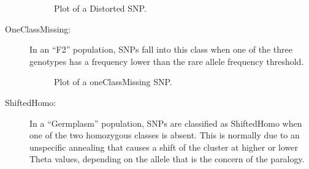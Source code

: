 \documentclass[a4paper,11pt,english]{article}
\begin{document}
\begin{description}
\begin{figure}[H]
\caption{Plot of a Distorted SNP.}\end{figure}

\item [OneClassMissing:] In an ``F2'' population, SNPs fall into this class when one of the three
genotypes has a frequency lower than the rare allele frequency threshold.
\begin{figure}[H]
\centering
\capstart

\caption{Plot of a oneClassMissing SNP.}\end{figure}

\item [ShiftedHomo:] In a ``Germplasm'' population, SNPs are classified as ShiftedHomo when one of
the two homozygous classes is absent. This is normally due to an unspecific annealing that causes a
shift of the cluster at higher or lower Theta values, depending on the allele that is the concern
of the paralogy.
\begin{figure}[H]
\centering
\capstart


\end{figure}
\end{description}
\end{document}
